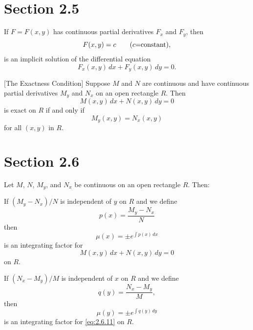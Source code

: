 \section*{Section 2.5}
\setcounter{chapter}{2}
\setcounter{section}{5}

\setcounter{theorem}{0}
\setcounter{equation}{5}
\begin{theorem}
  \label{thmtype:2.5.1} If $F=F(x,y)$ has continuous partial derivatives $F_{x}$ and $F_{y}$, then
  \begin{equation}
    \label{eq:2.5.6}F(x,y)=c\qquad\mbox{{\rm(}$c$=constant\mbox{)}},
  \end{equation}
  is an implicit solution of the differential equation
  \begin{equation}
    \label{eq:2.5.7}F_{x}(x,y)\,dx+F_{y}(x,y)\,dy=0.
  \end{equation}
\end{theorem}

\setcounter{theorem}{1}
\setcounter{equation}{11}
\begin{theorem}
  $[$The Exactness Condition$]$\label{thmtype:2.5.2} \space Suppose $M$ and $N$ are continuous and
  have continuous partial derivatives $M_{y}$ and $N_{x}$ on an open rectangle $R$. Then
  \[
    M(x,y)\,dx+N(x,y)\,dy=0
  \]
  is exact on $R$ if and only if
  \begin{equation}
    \label{eq:2.5.12}M_{y}(x,y)=N_{x}(x,y)
  \end{equation}
  for all $(x,y)$ in $R$.
\end{theorem}

\section*{Section 2.6}
\setcounter{chapter}{2}
\setcounter{section}{6}

\setcounter{theorem}{0}
\setcounter{equation}{9}
\begin{theorem}
  \label{thmtype:2.6.1} Let $M$, $N$, $M_{y}$, and $N_{x}$ be continuous on an open rectangle $R$.
  Then:
  \begin{alist}
    \item %
    If $(M_{y}-N_{x})/N$ is independent of $y$ on $R$ and we define
    \[
      p(x)=\frac{M_{y}-N_{x}}{N}
    \]
    then
    \begin{equation}
      \label{eq:2.6.10}\mu(x)=\pm e^{\int p(x)\,dx}
    \end{equation}
    is an integrating factor for
    \begin{equation}
      \label{eq:2.6.11}M(x,y)\,dx+N(x,y)\,dy=0
    \end{equation}
    on $R$.

    \item %
    If $(N_{x}-M_{y})/M$ is independent of $x$ on $R$ and we define
    \[
      q(y)=\frac{N_{x}-M_{y}}{M},
    \]
    then
    \begin{equation}
      \label{eq:2.6.12}\mu(y)=\pm e^{\int q(y)\,dy}
    \end{equation}
    is an integrating factor for \eqref{eq:2.6.11} on $R$.
  \end{alist}
\end{theorem}

